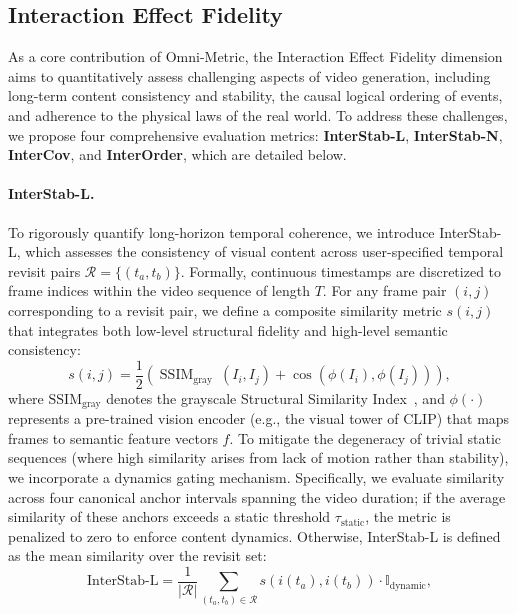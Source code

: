 \subsection{Interaction Effect Fidelity}
As a core contribution of Omni-Metric, the Interaction Effect Fidelity dimension aims to quantitatively assess challenging aspects of video generation, including long-term content consistency and stability, the causal logical ordering of events, and adherence to the physical laws of the real world. To address these challenges, we propose four comprehensive evaluation metrics: \textbf{InterStab-L}, \textbf{InterStab-N}, \textbf{InterCov}, and \textbf{InterOrder}, which are detailed below.

\paragraph{InterStab-L.} 
To rigorously quantify long-horizon temporal coherence, we introduce InterStab-L, which assesses the consistency of visual content across user-specified temporal revisit pairs $\mathcal{R}=\{(t_a, t_b)\}$. 
Formally, continuous timestamps are discretized to frame indices within the video sequence of length $T$. 
For any frame pair $(i, j)$ corresponding to a revisit pair, we define a composite similarity metric $s(i, j)$ that integrates both low-level structural fidelity and high-level semantic consistency:
\begin{equation}
s(i, j)=\frac{1}{2}\left(\operatorname{SSIM}_{\text {gray }}\left(I_i, I_j\right)+\cos \left(\phi(I_i), \phi(I_j)\right)\right),
\end{equation}
where $\mathrm{SSIM}_{\text{gray}}$ denotes the grayscale Structural Similarity Index~\cite{wang2004image}, and $\phi(\cdot)$ represents a pre-trained vision encoder (e.g., the visual tower of CLIP) that maps frames to semantic feature vectors $f$.  To mitigate the degeneracy of trivial static sequences (where high similarity arises from lack of motion rather than stability), we incorporate a dynamics gating mechanism. Specifically, we evaluate similarity across four canonical anchor intervals spanning the video duration; if the average similarity of these anchors exceeds a static threshold $\tau_{\text{static}}$, the metric is penalized to zero to enforce content dynamics. 
Otherwise, InterStab-L is defined as the mean similarity over the revisit set:
\begin{equation}
\text {InterStab-L}=\frac{1}{|\mathcal{R}|} \sum_{\left(t_a, t_b\right) \in \mathcal{R}} s\left(i(t_a), i(t_b)\right) \cdot \mathbb{I}_{\text{dynamic}},
\end{equation}
